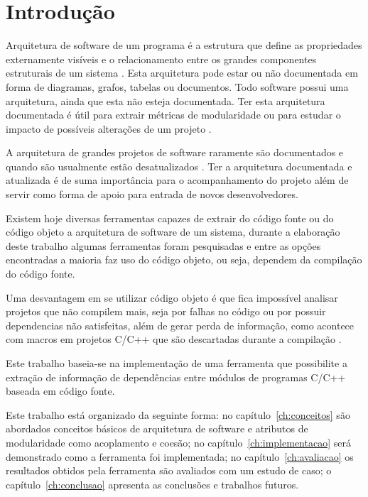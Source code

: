 \chapter{Introdução}

Arquitetura de software de um programa é a estrutura que define as propriedades
externamente visíveis e o relacionamento entre os grandes componentes
estruturais de um sistema \cite{engenhariaDeSoftwarePressman}. Esta arquitetura
pode estar ou não documentada em forma de diagramas, grafos, tabelas ou
documentos. Todo software possui uma arquitetura, ainda que esta não
esteja documentada. Ter
esta arquitetura documentada é útil para extrair métricas de modularidade ou
para estudar o impacto de possíveis alterações de um projeto
\cite{mata26-terceiro-projeto-piloto}.

A arquitetura de grandes projetos de software raramente são documentados e
quando são usualmente estão desatualizados
\cite{sourceVersusObjectCodeExtraction}. Ter a arquitetura documentada e
atualizada é de suma importância para o acompanhamento do projeto além de
servir como forma de apoio para entrada de novos desenvolvedores.

Existem hoje diversas ferramentas capazes de extrair do código fonte ou do
código objeto a arquitetura de software de um sistema, durante a elaboração
deste trabalho algumas ferramentas foram pesquisadas
\cite{sourceVersusObjectCodeExtraction} e entre as opções encontradas a maioria
faz uso do código objeto, ou seja, dependem da compilação do código fonte.

Uma desvantagem em se utilizar código objeto é que fica impossível analisar
projetos que não compilem mais, seja por falhas no código ou por possuir
dependencias não satisfeitas, além de gerar perda de informação, como acontece
com macros em projetos C/C++ que são descartadas durante a compilação
\cite{sourceVersusObjectCodeExtraction}.

Este trabalho baseia-se na implementação de uma ferramenta que possibilite a
extração de informação de dependências entre módulos de programas C/C++ baseada
em código fonte.

Este trabalho está organizado da seguinte forma: no capítulo~\ref{ch:conceitos}
são abordados conceitos básicos de arquitetura de software e atributos de
modularidade como acoplamento e coesão; no capítulo~\ref{ch:implementacao} será
demonstrado como a ferramenta foi implementada; no capítulo~\ref{ch:avaliacao}
os resultados obtidos pela ferramenta são avaliados com um estudo de caso; o
capítulo~\ref{ch:conclusao} apresenta as conclusões e trabalhos futuros.

